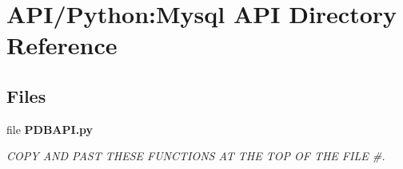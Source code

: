 \section{A\+P\+I/\+Python\+:Mysql A\+PI Directory Reference}
\label{dir_d32b687db4131fab6b951f61777e3774}
\subsection*{Files}
\begin{DoxyCompactItemize}
\item 
file {\bf P\+D\+B\+A\+P\+I.\+py}
\begin{DoxyCompactList}\small\item\em C\+O\+PY A\+ND P\+A\+ST T\+H\+E\+SE F\+U\+N\+C\+T\+I\+O\+NS AT T\+HE T\+OP OF T\+HE F\+I\+LE \#. \end{DoxyCompactList}\end{DoxyCompactItemize}
